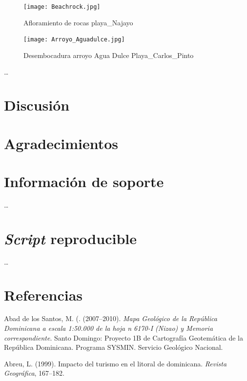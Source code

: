 \documentclass[11pt,]{article}
\begin{document}
\begin{figure}
\centering
\texttt{[image: Beachrock.jpg]}
\caption{Afloramiento de rocas playa\_Najayo\label{beachrock}}
\end{figure}

\begin{figure}
\centering
\texttt{[image: Arroyo\_Aguadulce.jpg]}
\caption{Desembocadura arroyo Agua Dulce
Playa\_Carlos\_Pinto\label{arroyo_aguadulce}}
\end{figure}

\ldots

\section{Discusión}\label{discusiuxf3n}

\section{Agradecimientos}\label{agradecimientos}

\section{Información de soporte}\label{informaciuxf3n-de-soporte}

\ldots

\section{\texorpdfstring{\emph{Script}
reproducible}{Script reproducible}}\label{script-reproducible}

\ldots

\section*{Referencias}\label{referencias}

\hypertarget{refs}{}
\hypertarget{ref-abad2007mapageonizao}{}
Abad de los Santos, M. (. (2007--2010). \emph{Mapa Geológico de la
República Dominicana a escala 1:50.000 de la hoja n 6170-I (Nizao) y
Memoria correspondiente}. Santo Domingo: Proyecto 1B de Cartografía
Geotemática de la República Dominicana. Programa SYSMIN. Servicio
Geológico Nacional.

\hypertarget{ref-abreu1999impacto}{}
Abreu, L. (1999). Impacto del turismo en el litoral de dominicana.
\emph{Revista Geográfica}, 167--182.
\end{document}
